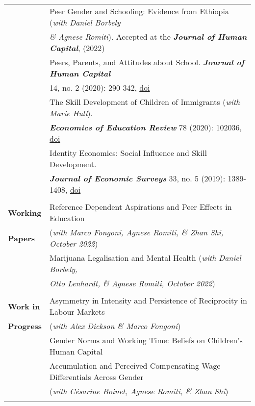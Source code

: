 \documentclass[11pt,a4paper]{article}
\begin{document}
\begin{longtable}{l l}
{																				&  Peer Gender and Schooling: Evidence from Ethiopia (\textit{with Daniel Borbely}    \\ 
																				&  \textit{\& Agnese Romiti}). Accepted at the \textbf{\textit{Journal of Human Capital}}, (2022)    \\ 
\addlinespace
																				&  Peers, Parents, and Attitudes about School. \textbf{\textit{Journal of Human Capital}}  \\
																				&  14, no. 2 (2020): 290-342, \href{https://doi.org/10.1086/709507}{doi}  \\   
\addlinespace						
																				&  The Skill Development of Children of Immigrants (\textit{with Marie Hull}).  \\ 
																				&  \textbf{\textit{Economics of Education Review}} 78 (2020): 102036, \href{https://doi.org/10.1016/j.econedurev.2020.102036}{doi}    \\			
\addlinespace
																				&  Identity Economics: Social Influence and Skill Development.     \\
																				&  \textbf{\textit{Journal of Economic Surveys}} 33, no. 5 (2019): 1389-1408, \href{ https://doi.org/10.1111/joes.12331}{doi}		\\			
																				&   \\
\textbf{Working} 							  &  Reference Dependent Aspirations and Peer Effects in Education  \\ 
\textbf{Papers}										&  (\textit{with Marco Fongoni, Agnese Romiti, \& Zhan Shi, October 2022})   \\
\addlinespace
																							& Marijuana Legalisation and Mental Health (\textit{with Daniel Borbely,}  \\ 
																							& \textit{Otto Lenhardt, \& Agnese Romiti, October 2022})   \\
																							&  \\
\textbf{Work in} 									&  Asymmetry in Intensity and Persistence of Reciprocity in Labour Markets  \\ 
\textbf{Progress}								&  (\textit{with Alex Dickson \& Marco Fongoni})   \\
\addlinespace										
																							&  Gender Norms and Working Time: Beliefs on Children's Human Capital  \\ 
																							&  Accumulation and Perceived Compensating Wage Differentials Across Gender    \\
																							& (\textit{with C\'esarine Boinet, Agnese Romiti, \& Zhan Shi})  \\
}
\end{longtable}
\end{document}
